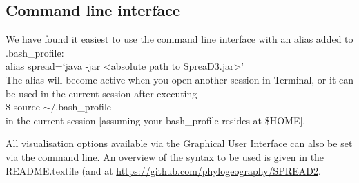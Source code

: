 \documentclass[english]{paper}
\begin{document}
\subsection{Command line interface}
\label{CLI}

We have found it easiest to use the command line interface with an alias added to .bash\_profile:
\\
alias spread=`java -jar <absolute path to SpreaD3.jar>' 
\\
The alias will become active when you open another session in Terminal, or it can be used in the current session after executing
\\
\$ source $\sim$/.bash\_profile
\\
in the current session  [assuming your bash\_profile resides at \$HOME]. 
\par
All visualisation options available via the Graphical User Interface can also be set via the command line. 
An overview of the syntax to be used is given in the README.textile (and at \url{https://github.com/phylogeography/SPREAD2}.


 
\end{document}
